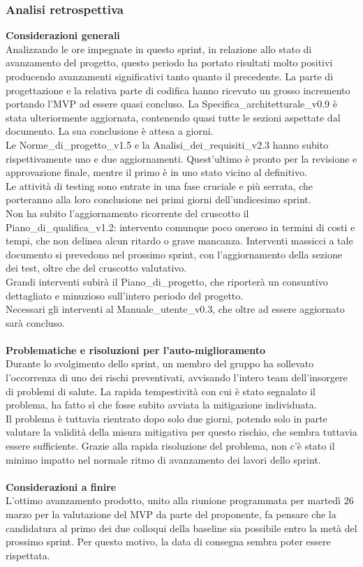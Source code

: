 \newpage
\subsubsection{Analisi retrospettiva}
\textbf{Considerazioni generali}\\
Analizzando le ore impegnate in questo sprint, in relazione allo stato di avanzamento del progetto, questo periodo ha portato risultati molto positivi producendo avanzamenti significativi tanto quanto il precedente. La parte di progettazione e la relativa parte di codifica hanno ricevuto un grosso incremento portando l'MVP ad essere quasi concluso. La Specifica\_architetturale\_v0.9 è stata ulteriormente aggiornata, contenendo quasi tutte le sezioni aspettate dal documento. La sua conclusione è attesa a giorni.\\
Le Norme\_di\_progetto\_v1.5 e la Analisi\_dei\_requisiti\_v2.3 hanno subito rispettivamente uno e due aggiornamenti. Quest'ultimo è pronto per la revisione e approvazione finale, mentre il primo è in uno stato vicino al definitivo.\\
Le attività di testing sono entrate in una fase cruciale e più serrata, che porteranno alla loro conclusione nei primi giorni dell'undicesimo sprint.\\
Non ha subito l'aggiornamento ricorrente del cruscotto il Piano\_di\_qualifica\_v1.2: intervento comunque poco oneroso in termini di costi e tempi, che non delinea alcun ritardo o grave mancanza. Interventi massicci a tale documento si prevedono nel prossimo sprint, con l'aggiornamento della sezione dei test, oltre che del cruscotto valutativo.\\
Grandi interventi subirà il Piano\_di\_progetto, che riporterà un consuntivo dettagliato e minuzioso sull'intero periodo del progetto.\\
Necessari gli interventi al Manuale\_utente\_v0.3, che oltre ad essere aggiornato sarà concluso.
\\ \\
\textbf{Problematiche e risoluzioni per l'auto-miglioramento}\\
Durante lo svolgimento dello sprint, un membro del gruppo ha sollevato l'occorrenza di uno dei rischi preventivati, avvisando l'intero team dell'insorgere di problemi di salute. La rapida tempestività con cui è stato segnalato il problema, ha fatto sì che fosse subito avviata la mitigazione individuata.\\
Il problema è tuttavia rientrato dopo solo due giorni, potendo solo in parte valutare la validità della misura mitigativa per questo rischio, che sembra tuttavia essere sufficiente. Grazie alla rapida risoluzione del problema, non c'è stato il minimo impatto nel normale ritmo di avanzamento dei lavori dello sprint.
\\ \\
\textbf{Considerazioni a finire}\\
L'ottimo avanzamento prodotto, unito alla riunione programmata per martedì 26 marzo per la valutazione del MVP da parte del proponente, fa pensare che la candidatura al primo dei due colloqui della baseline sia possibile entro la metà del prossimo sprint.
Per questo motivo, la data di consegna sembra poter essere rispettata.
